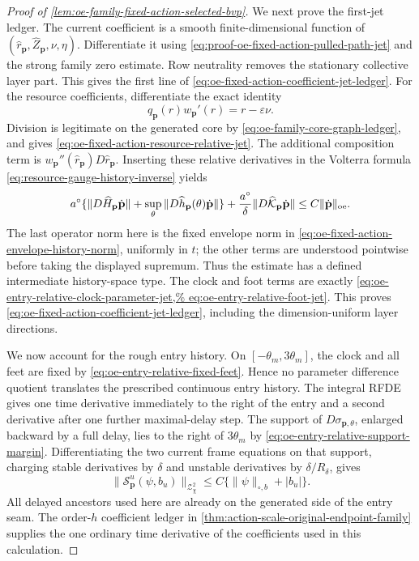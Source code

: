 \begin{proof}[Proof of
\cref{lem:oe-family-fixed-action-selected-bvp}]
We next prove the first-jet ledger.  The current coefficient is a smooth
finite-dimensional function of
\((\widehat r_{\mathbf p},\widehat Z_{\mathbf p},\nu,\eta)\).
Differentiate it using
\cref{eq:proof-oe-fixed-action-pulled-path-jet} and the strong family
zero estimate.  Row neutrality removes the stationary collective layer
part.  This gives the first line of
\cref{eq:oe-fixed-action-coefficient-jet-ledger}.  For the resource
coefficients, differentiate the exact identity
\[
 q_{\mathbf p}(r)w_{\mathbf p}'(r)=r-\varepsilon\nu.
\]
Division is legitimate on the generated core by
\cref{eq:oe-family-core-graph-ledger}, and gives
\cref{eq:oe-fixed-action-resource-relative-jet}.  The additional
composition term is
\(w_{\mathbf p}''(\widehat r_{\mathbf p})
 D\widehat r_{\mathbf p}\).  Inserting these relative derivatives in
the Volterra formula
\cref{eq:resource-gauge-history-inverse} yields
\begin{equation}
 a^\circ\{\|D\widehat H_{\mathbf p}\dot{\mathbf p}\|
       +\sup_\theta\|D\widehat h_{\mathbf p}(\theta)
                         \dot{\mathbf p}\|\}
 +\frac{a^\circ}{\delta}
       \|D\widehat{\mathcal K}_{\mathbf p}
                         \dot{\mathbf p}\|
 \le C\|\dot{\mathbf p}\|_{\rm oe}.             \label{eq:proof-oe-fixed-action-resource-jets}
\end{equation}
The last operator norm here is the fixed envelope norm in
\cref{eq:oe-fixed-action-envelope-history-norm}, uniformly in \(t\);
the other terms are understood pointwise before taking the displayed
supremum.  Thus the estimate has a defined intermediate history-space
type.
The clock and foot terms are exactly
\cref{eq:oe-entry-relative-clock-parameter-jet,%
eq:oe-entry-relative-foot-jet}.  This proves
\cref{eq:oe-fixed-action-coefficient-jet-ledger}, including the
dimension-uniform layer directions.

We now account for the rough entry history.  On
\([-\theta_m,3\theta_m]\), the clock and all feet are fixed by
\cref{eq:oe-entry-relative-fixed-feet}.  Hence no parameter difference
quotient translates the prescribed continuous entry history.  The
integral RFDE gives one time derivative immediately to the right of the
entry and a second derivative after one further maximal-delay step.
The support of \(D\sigma_{\mathbf p,\theta}\), enlarged backward by a
full delay, lies to the right of \(3\theta_m\) by
\cref{eq:oe-entry-relative-support-margin}.  Differentiating the two
current frame equations on that support, charging stable derivatives by
\(\delta\) and unstable derivatives by \(\delta/R_\delta\), gives
\begin{equation}
 \|\mathscr S_{\mathbf p}^{u}(\psi,b_u)\|_
       {\mathcal Z_\chi^2}
 \le C\{\|\psi\|_{\circ,b}+|b_u|\}.             \label{eq:proof-oe-fixed-action-eventual-C2}
\end{equation}
All delayed ancestors used here are already on the generated side of
the entry seam.  The order-\(h\) coefficient ledger in
\cref{thm:action-scale-original-endpoint-family} supplies the one
ordinary time derivative of the coefficients used in this calculation.


\end{proof}
